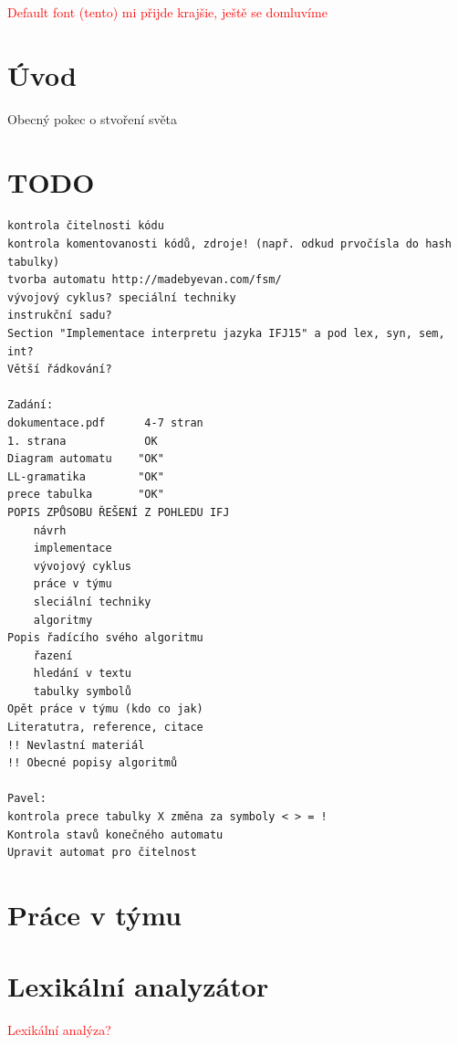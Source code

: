 \documentclass[a4paper, 12pt]{article}
\begin{document}
\tableofcontents
\newpage
\textcolor{red}{Default font (tento) mi přijde krajšie, ještě se domluvíme}
\section{Úvod} \label{uvod}
Obecný pokec o stvoření světa
\section{TODO} \label{todo}
\begin{verbatim}
kontrola čitelnosti kódu
kontrola komentovanosti kódů, zdroje! (např. odkud prvočísla do hash tabulky)
tvorba automatu http://madebyevan.com/fsm/
vývojový cyklus? speciální techniky
instrukční sadu?
Section "Implementace interpretu jazyka IFJ15" a pod lex, syn, sem, int?
Větší řádkování?

Zadání:
dokumentace.pdf      4-7 stran
1. strana            OK
Diagram automatu    "OK"
LL-gramatika        "OK"
prece tabulka       "OK"
POPIS ZPŮSOBU ŘEŠENÍ Z POHLEDU IFJ
    návrh
    implementace
    vývojový cyklus
    práce v týmu
    sleciální techniky
    algoritmy
Popis řadícího svého algoritmu
    řazení
    hledání v textu
    tabulky symbolů
Opět práce v týmu (kdo co jak)
Literatutra, reference, citace
!! Nevlastní materiál
!! Obecné popisy algoritmů

Pavel:
kontrola prece tabulky X změna za symboly < > = !
Kontrola stavů konečného automatu
Upravit automat pro čitelnost
\end{verbatim}
\newpage
\section{Práce v týmu} \label{team}

\section{Lexikální analyzátor} \label{lexer}
\textcolor{red}{Lexikální analýza?}
\end{document}
